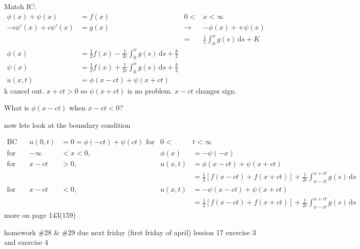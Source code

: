 \documentclass{article}
\begin{document}
Match IC:
\begin{align*}
  \phi(x)+\psi(x)&=f(x)&0<&x<\infty\\
  -c\phi'(x)+c\psi'(x)&=g(x)&\to&-\phi(x)++\psi(x)\\
  &&=&\frac{1}{c}\int_0^x{g(s)\,\mathrm{d}s}+K\\
  \phi(x)&=\frac{1}{2}f(x)-\frac{1}{2c}\int_0^x{g(s)\,\mathrm{d}s}+ \frac{k}{2}\\
  \psi(x)&=\frac{1}{2}f(x)+\frac{1}{2c}\int_0^x{g(s)\,\mathrm{d}s}+ \frac{k}{2}\\
  u(x,t)&=\phi(x-ct)+\psi(x+ct)
\end{align*}
k cancel out. $x+ct>0$ so $\psi(x+ct)$ is no problem. $x-ct$ changes sign.

What is $\phi(x-ct)$ when $x-ct<0$?

now lets look at the boundary condition

\begin{align*}
  \text{BC}&&u(0,t)&=0=\phi(-ct)+\psi(ct)\text{ for}&0<&t<\infty\\
  \text{for }&&-\infty&<x<0,&\phi(x)&=-\psi(-x)\\
  \text{for }&&x-ct&>0,&u(x,t)&=\phi(x-ct)+\psi(x+ct)\\
  &&&&&=\frac{1}{2}\left[f(x-ct)+f(x+ct)\right]+\frac{1}{2c}\int_{x-ct}^{x+ct}{g(s)\,\mathrm{d}s}\\
  \text{for }&&x-ct&<0,&u(x,t)&=-\psi(x-ct)+\psi(x+ct)\\
  &&&&&=\frac{1}{2}\left[f(x-ct)+f(x+ct)\right]+\frac{1}{2c}\int_{x-ct}^{x+ct}{g(s)\,\mathrm{d}s}
\end{align*}
more on page 143(159)


homework \#28 \& \#29 due next friday (first friday of april) lession 17 exercise 3 and exercise 4
\end{document}

